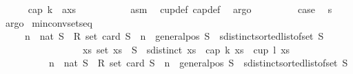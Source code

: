 \begin{isabellebody}
\isanewline
\ \ \ \ \isamarkupfalse%
\ {\isachardoublequoteopen}cap\ k\ \ {\isacharparenleft}{\kern0pt}a{\isacharhash}{\kern0pt}xs{\isacharparenright}{\kern0pt}{\isachardoublequoteclose}\ \isanewline
\ \ \ \ \ \ \isamarkupfalse%
\ {}\ {}\ asm\ \isamarkupfalse%
\ cup{\isacharunderscore}{\kern0pt}def\ cap{\isacharunderscore}{\kern0pt}def\ \isamarkupfalse%
\ argo\ \isanewline
\ \ \isamarkupfalse%
\isanewline
\ \ \isamarkupfalse%
\ \isamarkupfalse%
\ {\isacharquery}{\kern0pt}case\ \isamarkupfalse%
\ s{}\ \isamarkupfalse%
\ argo\isanewline
{}\isamarkupfalse%
%
\endisatagproof
{\isafoldproof}%
%
\isadelimproof
\isanewline
%
\endisadelimproof
\isanewline
{}\isamarkupfalse%
\ min{\isacharunderscore}{\kern0pt}conv{\isacharunderscore}{\kern0pt}sets{\isacharunderscore}{\kern0pt}eq{\isacharcolon}{\kern0pt}\isanewline
\ \ \ \ \ {\isachardoublequoteopen}{\isacharbraceleft}{\kern0pt}n\ {\isacharcolon}{\kern0pt}{\isacharcolon}{\kern0pt}\ nat{\isachardot}{\kern0pt}\ {\isacharparenleft}{\kern0pt}{\isasymforall}S\ {\isacharcolon}{\kern0pt}{\isacharcolon}{\kern0pt}\ R{}\ set{\isachardot}{\kern0pt}\ {\isacharparenleft}{\kern0pt}card\ S\ {\isasymge}\ n\ {\isasymand}\ general{\isacharunderscore}{\kern0pt}pos\ S\ {\isasymand}\ sdistinct{\isacharparenleft}{\kern0pt}sorted{\isacharunderscore}{\kern0pt}list{\isacharunderscore}{\kern0pt}of{\isacharunderscore}{\kern0pt}set\ S{\isacharparenright}{\kern0pt}{\isacharparenright}{\kern0pt}\isanewline
\ \ \ \ \ \ \ \ \ \ \ \ \ \ \ \ {\isasymlongrightarrow}\ {\isacharparenleft}{\kern0pt}{\isasymexists}xs{\isachardot}{\kern0pt}\ set\ xs\ {\isasymsubseteq}\ S\ {\isasymand}\ sdistinct\ xs\ {\isasymand}\ {\isacharparenleft}{\kern0pt}cap\ k\ xs\ {\isasymor}\ cup\ l\ xs{\isacharparenright}{\kern0pt}{\isacharparenright}{\kern0pt}{\isacharparenright}{\kern0pt}{\isacharbraceright}{\kern0pt}\isanewline
\ \ \ \ \ \ \ \ \ {\isacharequal}{\kern0pt}\ {\isacharbraceleft}{\kern0pt}n\ {\isacharcolon}{\kern0pt}{\isacharcolon}{\kern0pt}\ nat{\isachardot}{\kern0pt}\ {\isacharparenleft}{\kern0pt}{\isasymforall}S\ {\isacharcolon}{\kern0pt}{\isacharcolon}{\kern0pt}\ R{}\ set{\isachardot}{\kern0pt}\ {\isacharparenleft}{\kern0pt}card\ S\ {\isasymge}\ n\ {\isasymand}\ general{\isacharunderscore}{\kern0pt}pos\ S\ {\isasymand}\ sdistinct{\isacharparenleft}{\kern0pt}sorted{\isacharunderscore}{\kern0pt}list{\isacharunderscore}{\kern0pt}of{\isacharunderscore}{\kern0pt}set\ S{\isacharparenright}{\kern0pt}{\isacharparenright}{\kern0pt}\isanewline

\end{isabellebody}
